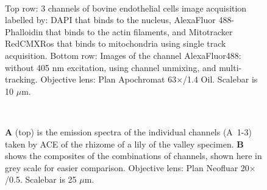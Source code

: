 \begin{figure}[h!]
\\
\caption{Top row: 3 channels of bovine endothelial cells image acquisition labelled by: DAPI that binds to the nucleus, AlexaFluor 488-Phalloidin that binds to the actin filaments, and Mitotracker RedCMXRos that binds to mitochondria using single track acquisition. 
Bottom row: Images of the channel AlexaFluor488: without 405 nm excitation, using channel unmixing, and multi-tracking. 
Objective lens: Plan Apochromat 63$\times$/1.4 Oil. 
Scalebar is 10 $\mu$m.} 
\label{fig:bovendo}
\end{figure}

\begin{figure}[h!]
\centering
{}\hfill
{}\\
\caption{\textbf{A} (top) is the emission spectra of the individual channels (A~1-3) taken by ACE of the rhizome of a lily of the valley specimen. 
\textbf{B} shows the composites of the combinations of channels, shown here in grey scale for easier comparison. 
Objective lens: Plan Neofluar 20$\times$/0.5. 
Scalebar is 25 $\mu$m.}
\label{fig:autace}
\end{figure}

